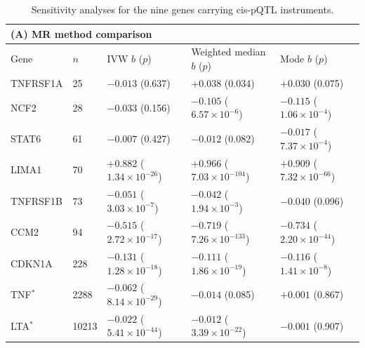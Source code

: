 \begin{table}[htbp]
\centering
\caption{Sensitivity analyses for the nine genes carrying cis-pQTL instruments.}
\label{tab:mr_sensitivity}
\footnotesize
\begin{tabular}{lllll}
\toprule
\multicolumn{5}{l}{\textbf{(A)} MR method comparison}\\
\midrule
  Gene & $n$ & IVW $b$ ($p$) & Weighted median $b$ ($p$) & Mode $b$ ($p$) \\
\midrule
  TNFRSF1A  & 25    & $-0.013$ (0.637)                & $+0.038$ (0.034)                 & $+0.030$ (0.075) \\
  NCF2      & 28    & $-0.033$ (0.156)                & $-0.105$ ($6.57\times10^{-6}$)   & $-0.115$ ($1.06\times10^{-4}$) \\
  STAT6     & 61    & $-0.007$ (0.427)                & $-0.012$ (0.082)                 & $-0.017$ ($7.37\times10^{-4}$) \\
  LIMA1     & 70    & $+0.882$ ($1.34\times10^{-26}$) & $+0.966$ ($7.03\times10^{-104}$) & $+0.909$ ($7.32\times10^{-66}$) \\
  TNFRSF1B  & 73    & $-0.051$ ($3.03\times10^{-7}$)  & $-0.042$ ($1.94\times10^{-3}$)   & $-0.040$ (0.096) \\
  CCM2      & 94    & $-0.515$ ($2.72\times10^{-17}$) & $-0.719$ ($7.26\times10^{-133}$) & $-0.734$ ($2.20\times10^{-44}$) \\
  CDKN1A    & 228   & $-0.131$ ($1.28\times10^{-18}$) & $-0.111$ ($1.86\times10^{-19}$)  & $-0.116$ ($1.41\times10^{-8}$) \\
  TNF$^{*}$ & 2288  & $-0.062$ ($8.14\times10^{-29}$) & $-0.014$ (0.085)                 & $+0.001$ (0.867) \\
  LTA$^{*}$ & 10213 & $-0.022$ ($5.41\times10^{-44}$) & $-0.012$ ($3.39\times10^{-22}$)  & $-0.001$ (0.907) \\
\bottomrule
\end{tabular}

\vspace{1.4em}


\end{table}
